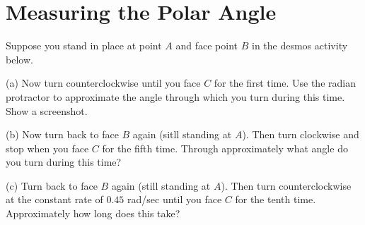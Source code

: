 \documentclass{ximera}
\begin{document}
\section{Measuring the Polar Angle}



 
 



\begin{exploration}\label{exp:angles1}
Suppose you stand in place at point $A$ and face point $B$ in the desmos activity below. 

(a) Now turn counterclockwise until you face $C$ for the first time. Use the radian protractor to approximate the angle through which you turn during this time. Show a screenshot.

(b) Now turn back to face $B$ again (sitll standing at $A$). Then turn clockwise and stop when you face $C$ for the fifth time. Through approximately what angle do you turn during this time? 

(c) Turn back to face $B$ again (still standing at $A$). Then turn counterclockwise at the constant rate of $0.45$ rad/sec until you face $C$ for the tenth time. Approximately how long does this take? 


 
\begin{onlineOnly}
    \begin{center}
\end{center}
\end{onlineOnly}
\end{exploration}
\end{document}
